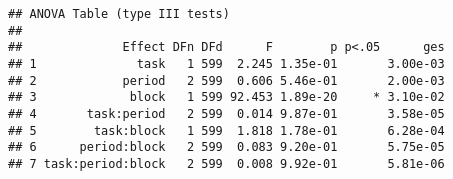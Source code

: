 \documentclass[
]{article}
\begin{document}
\begin{verbatim}
## ANOVA Table (type III tests)
## 
##              Effect DFn DFd      F        p p<.05      ges
## 1              task   1 599  2.245 1.35e-01       3.00e-03
## 2            period   2 599  0.606 5.46e-01       2.00e-03
## 3             block   1 599 92.453 1.89e-20     * 3.10e-02
## 4       task:period   2 599  0.014 9.87e-01       3.58e-05
## 5        task:block   1 599  1.818 1.78e-01       6.28e-04
## 6      period:block   2 599  0.083 9.20e-01       5.75e-05
## 7 task:period:block   2 599  0.008 9.92e-01       5.81e-06
\end{verbatim}
\end{document}
